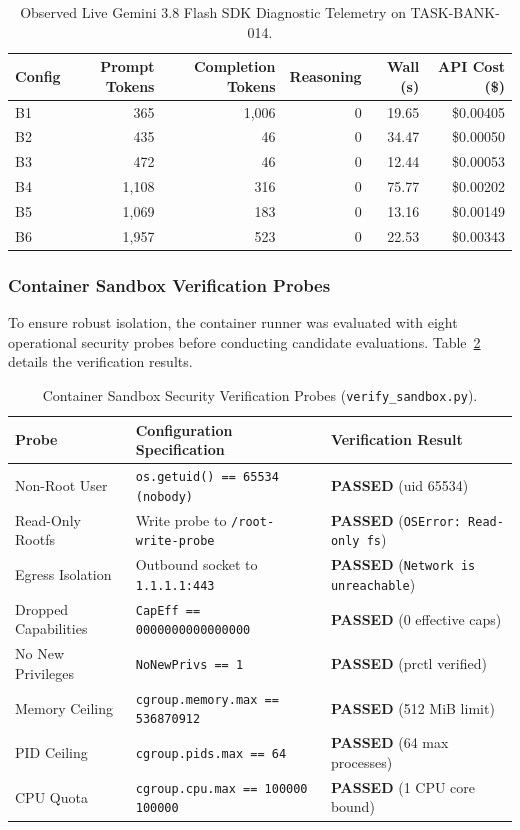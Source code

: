 \begin{table}[h]
\centering\small
\caption{Observed Live Gemini 3.8 Flash SDK Diagnostic Telemetry on TASK-BANK-014.}
\label{tab:live_sdk_diagnostics}
\begin{tabular}{lrrrrr}
\toprule
Config & Prompt Tokens & Completion Tokens & Reasoning & Wall (s) & API Cost (\$) \\
\midrule
B1 & 365 & 1,006 & 0 & 19.65 & \$0.00405 \\
B2 & 435 & 46 & 0 & 34.47 & \$0.00050 \\
B3 & 472 & 46 & 0 & 12.44 & \$0.00053 \\
B4 & 1,108 & 316 & 0 & 75.77 & \$0.00202 \\
B5 & 1,069 & 183 & 0 & 13.16 & \$0.00149 \\
B6 & 1,957 & 523 & 0 & 22.53 & \$0.00343 \\
\bottomrule
\end{tabular}
\end{table}

\subsubsection{Container Sandbox Verification Probes}
To ensure robust isolation, the container runner was evaluated with eight operational security probes before conducting candidate evaluations. Table~\ref{tab:sandbox_verification} details the verification results.

\begin{table}[h]
\centering\small
\caption{Container Sandbox Security Verification Probes (\texttt{verify\_sandbox.py}).}
\label{tab:sandbox_verification}
\begin{tabular}{lll}
\toprule
Probe & Configuration Specification & Verification Result \\
\midrule
Non-Root User & \texttt{os.getuid() == 65534 (nobody)} & \textbf{PASSED} (uid 65534) \\
Read-Only Rootfs & Write probe to \texttt{/root-write-probe} & \textbf{PASSED} (\texttt{OSError: Read-only fs}) \\
Egress Isolation & Outbound socket to \texttt{1.1.1.1:443} & \textbf{PASSED} (\texttt{Network is unreachable}) \\
Dropped Capabilities & \texttt{CapEff == 0000000000000000} & \textbf{PASSED} (0 effective caps) \\
No New Privileges & \texttt{NoNewPrivs == 1} & \textbf{PASSED} (prctl verified) \\
Memory Ceiling & \texttt{cgroup.memory.max == 536870912} & \textbf{PASSED} (512 MiB limit) \\
PID Ceiling & \texttt{cgroup.pids.max == 64} & \textbf{PASSED} (64 max processes) \\
CPU Quota & \texttt{cgroup.cpu.max == 100000 100000} & \textbf{PASSED} (1 CPU core bound) \\
\bottomrule
\end{tabular}
\end{table}

